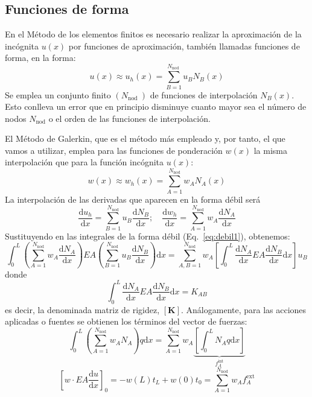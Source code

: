 \subsection{Funciones de forma}
\label{sec:N}
En el Método de los elementos finitos es necesario realizar la aproximación de la incógnita $u(x)$ por funciones de aproximación, también llamadas funciones de forma, en la forma:
\begin{equation}\label{eq:N1}
u(x) \approx u_{h}(x)=\sum_{B=1}^{N_{\text {nod }}} u_{B} N_{B}(x)
\end{equation}
Se emplea un conjunto finito $\left(N_{\text {nod }}\right)$ de funciones de interpolación $N_{B}(x)$. Esto conlleva un error que en principio disminuye cuanto mayor sea el número de nodos $N_{\text {nod}}$ o el orden de las funciones de interpolación.

El Método de Galerkin, que es el método más empleado y, por tanto, el que vamos a utilizar, emplea para las funciones de ponderación $w(x)$ la misma interpolación que para la función incógnita $u(x)$:
\begin{equation}\label{eq:N2}
w(x) \approx w_{h}(x)=\sum_{A=1}^{N_{\mathrm{nod}}} w_{A} N_{A}(x)
\end{equation}
La interpolación de las derivadas que aparecen en la forma débil será
\begin{equation}\label{eq:N3}
\frac{\mathrm{d} u_{h}}{\mathrm{d} x}=\sum_{B=1}^{N_{\mathrm{nod}}} u_{B} \frac{\mathrm{d} N_{B}}{\mathrm{d} x} ; \quad \frac{\mathrm{d} w_{h}}{\mathrm{d} x}=\sum_{A=1}^{N_{\mathrm{nod}}} w_{A} \frac{\mathrm{d} N_{A}}{\mathrm{d} x}
\end{equation}
Sustituyendo en las integrales de la forma débil (Eq.~\eqref{eq:debil1}), obtenemos:
\begin{equation}\label{eq:N4}
 \int_{0}^{L}\left(\sum_{A=1}^{N_{\mathrm{nod}}} w_{A} \frac{\mathrm{d} N_{A}}{\mathrm{d} x}\right) EA\left(\sum_{B=1}^{N_{\mathrm{nod}}} u_{B} \frac{\mathrm{d} N_{B}}{\mathrm{d} x}\right) \mathrm{d} x = \sum_{A, B=1}^{N_{\mathrm{nod}}} w_{A}\left[\left.\int_{0}^{L} \frac{\mathrm{d} N_{A}}{\mathrm{d} x} EA \frac{\mathrm{d} N_{B}}{\mathrm{d} x} \mathrm{d} x\right] u_{B}\right. 
\end{equation}
donde 
$$\int_{0}^{L} \frac{\mathrm{d} N_{A}}{\mathrm{d} x} EA \frac{\mathrm{d} N_{B}}{\mathrm{d} x} \mathrm{d} x = K_{AB}$$
es decir,  la denominada matriz de rigidez, $\left[\bm{K} \right]$. Análogamente, para las acciones aplicadas o fuentes se obtienen
los términos del vector de fuerzas:
\begin{equation}\label{eq:N5}
\int_{0}^{L}\left(\sum_{A=1}^{N_{\mathrm{nod}}} w_{A} N_{A}\right) q \mathrm{d} x=\sum_{A=1}^{N_{\mathrm{nod}}} w_{A} \underbrace{\left[\int_{0}^{L} N_{A} q \mathrm{d} x\right]}_{f_{A}^{\mathrm{int}}}
\end{equation}
\begin{equation}\label{eq:N6}
\left[w \cdot EA \frac{\mathrm{d} u}{\mathrm{d}x} \right]_{0}=-w(L) t_{L}+w(0) t_{0}=\sum_{A=1}^{N_{\mathrm{nod}}} w_{A} f_{A}^{\mathrm{ext}}
\end{equation}

